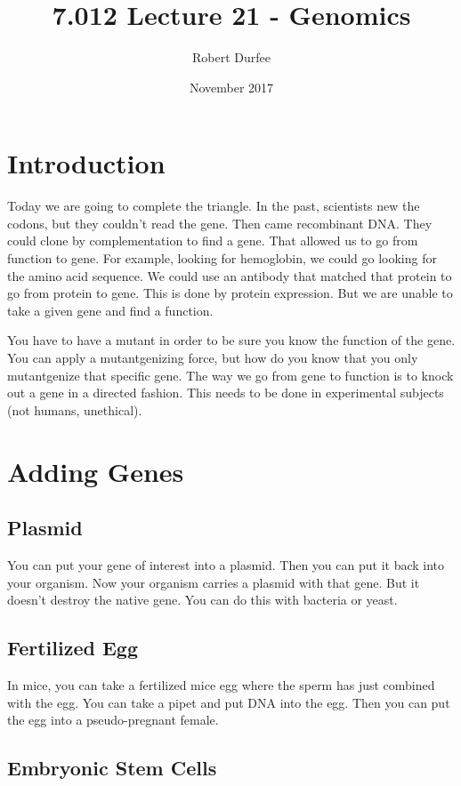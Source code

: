 \documentclass{article}
\title{7.012 Lecture 21 - Genomics}
\author{Robert Durfee}
\date{November 2017}
\begin{document}
\maketitle

\section{Introduction}

Today we are going to complete the triangle. In the past, scientists new the
codons, but they couldn't read the gene. Then came recombinant DNA. They could
clone by complementation to find a gene. That allowed us to go from function to
gene. For example, looking for hemoglobin, we could go looking for the amino
acid sequence. We could use an antibody that matched that protein to go from
protein to gene. This is done by protein expression. But we are unable to take a
given gene and find a function.

You have to have a mutant in order to be sure you know the function of the gene.
You can apply a mutantgenizing force, but how do you know that you only
mutantgenize that specific gene. The way we go from gene to function is to knock
out a gene in a directed fashion. This needs to be done in experimental subjects
(not humans, unethical).

\section{Adding Genes}

\subsection{Plasmid}

You can put your gene of interest into a plasmid. Then you can put it back into
your organism. Now your organism carries a plasmid with that gene. But it
doesn't destroy the native gene. You can do this with bacteria or yeast.

\subsection{Fertilized Egg}

In mice, you can take a fertilized mice egg where the sperm has just combined
with the egg. You can take a pipet and put DNA into the egg. Then you can put
the egg into a pseudo-pregnant female.

\subsection{Embryonic Stem Cells}
\end{document}
